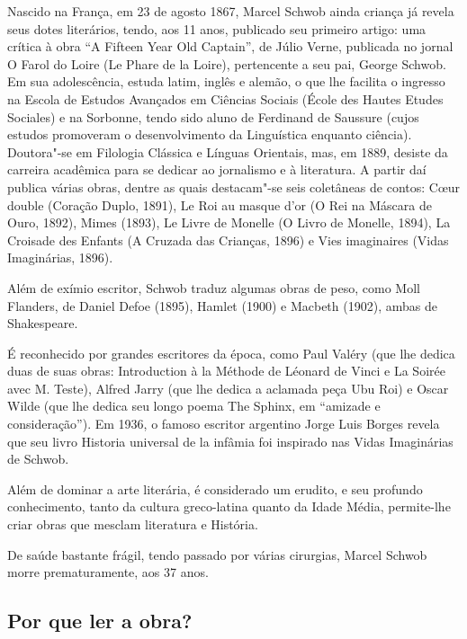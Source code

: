 \documentclass[12pt]{extarticle}
\begin{document}
Nascido na França, em 23 de agosto 1867, Marcel Schwob ainda criança já revela
seus dotes literários, tendo, aos 11 anos, publicado seu primeiro
artigo: uma crítica à obra ``A Fifteen Year Old Captain'', de Júlio Verne,
publicada no jornal O Farol do Loire (Le Phare de la Loire), pertencente
a seu pai, George Schwob. Em sua adolescência, estuda latim, inglês e
alemão, o que lhe facilita o ingresso na Escola de Estudos Avançados em
Ciências Sociais (École des Hautes Etudes Sociales) e na Sorbonne, tendo
sido aluno de Ferdinand de Saussure (cujos estudos promoveram o
desenvolvimento da Linguística enquanto ciência). Doutora"-se em
Filologia Clássica e Línguas Orientais, mas, em 1889, desiste da
carreira acadêmica para se dedicar ao jornalismo e à literatura. A
partir daí publica várias obras, dentre as quais destacam"-se seis
coletâneas de contos: Cœur double (Coração Duplo, 1891), Le Roi au
masque d'or (O Rei na Máscara de Ouro, 1892), Mimes (1893), Le Livre de
Monelle (O Livro de Monelle, 1894), La Croisade des Enfants (A Cruzada
das Crianças, 1896) e Vies imaginaires (Vidas Imaginárias, 1896).




Além de exímio escritor, Schwob traduz algumas obras de peso, como Moll
Flanders, de Daniel Defoe (1895), Hamlet (1900) e Macbeth (1902), ambas
de Shakespeare.

É reconhecido por grandes escritores da época, como Paul Valéry (que lhe
dedica duas de suas obras: Introduction à la Méthode de Léonard de Vinci
e La Soirée avec M. Teste), Alfred Jarry (que lhe dedica a aclamada peça
Ubu Roi) e Oscar Wilde (que lhe dedica seu longo poema The Sphinx, em
``amizade e consideração''). Em 1936, o famoso escritor argentino Jorge
Luis Borges revela que seu livro Historia universal de la infâmia foi
inspirado nas Vidas Imaginárias de Schwob.




Além de dominar a arte literária, é considerado um erudito, e seu
profundo conhecimento, tanto da cultura greco-latina quanto da Idade
Média, permite-lhe criar obras que mesclam literatura e História.

De saúde bastante frágil, tendo passado por várias cirurgias, Marcel
Schwob morre prematuramente, aos 37 anos.

\subsection{Por que ler a obra?}
\end{document}
